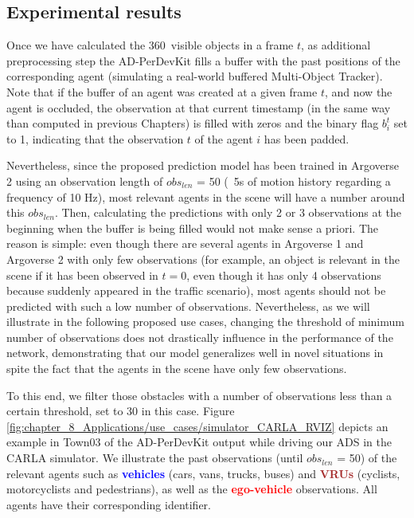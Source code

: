 \subsection{Experimental results}
\label{subsec:8_experimental_results}

Once we have calculated the 360\degree~visible objects in a frame $t$, as additional preprocessing step the \ac{AD-PerDevKit} fills a buffer with the past positions of the corresponding agent (simulating a real-world buffered Multi-Object Tracker). Note that if the buffer of an agent was created at a given frame $t$, and now the agent is occluded, the observation at that current timestamp (in the same way than computed in previous Chapters) is filled with zeros and the binary flag $b_i^t$ set to 1, indicating that the observation $t$ of the agent $i$ has been padded. 

Nevertheless, since the proposed prediction model has been trained in Argoverse 2 using an observation length of \textit{$obs_{len}$} = 50 (\ie \ 5s of motion history regarding a frequency of 10 Hz), most relevant agents in the scene will have a number around this \textit{$obs_{len}$}. Then, calculating the predictions with only 2 or 3 observations at the beginning when the buffer is being filled would not make sense a priori. The reason is simple: even though there are several agents in Argoverse 1 and Argoverse 2 with only few observations (for example, an object is relevant in the scene if it has been observed in $t=0$, even though it has only 4 observations because suddenly appeared in the traffic scenario), most agents should not be predicted with such a low number of observations. Nevertheless, as we will illustrate in the following proposed use cases, changing the threshold of minimum number of observations does not drastically influence in the performance of the network, demonstrating that our model generalizes well in novel situations in spite the fact that the agents in the scene have only few observations.

To this end, we filter those obstacles with a number of observations less than a certain threshold, set to 30 in this case. Figure \ref{fig:chapter_8_Applications/use_cases/simulator_CARLA_RVIZ} depicts an example in Town03 of the \ac{AD-PerDevKit} output while driving our \ac{ADS} in the \ac{CARLA} simulator. We illustrate the past observations (until \textit{$obs_{len}$} = 50) of the relevant agents such as \textbf{\textcolor{blue}{vehicles}} (cars, vans, trucks, buses) and \textbf{\textcolor{brown}{VRUs}} (cyclists, motorcyclists and pedestrians), as well as the \textbf{\textcolor{red}{ego-vehicle}} observations. All agents have their corresponding identifier.

